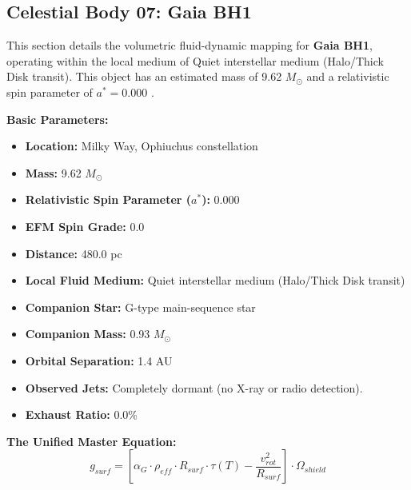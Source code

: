 \documentclass[11pt, a4paper]{article}
\begin{document}
\clearpage
\subsection{Celestial Body 07: Gaia BH1}
This section details the volumetric fluid-dynamic mapping for \textbf{Gaia BH1}, operating within the local medium of Quiet interstellar medium (Halo/Thick Disk transit). This object has an estimated mass of 9.62 $M_{\odot}$ and a relativistic spin parameter of $a^* = 0.000$ \cite{el-badry2023, simbad}.

\vspace{0.5em}
\noindent \textbf{Basic Parameters:}
\begin{itemize}
  \item \textbf{Location:} Milky Way, Ophiuchus constellation
  \item \textbf{Mass:} 9.62 $M_{\odot}$
  \item \textbf{Relativistic Spin Parameter ($a^*$):} 0.000
  \item \textbf{EFM Spin Grade:} 0.0
  \item \textbf{Distance:} 480.0 pc
  \item \textbf{Local Fluid Medium:} Quiet interstellar medium (Halo/Thick Disk transit)
  \item \textbf{Companion Star:} G-type main-sequence star
  \item \textbf{Companion Mass:} 0.93 $M_{\odot}$
  \item \textbf{Orbital Separation:} 1.4 AU
  \item \textbf{Observed Jets:} Completely dormant (no X-ray or radio detection).
  \item \textbf{Exhaust Ratio:} 0.0\%
\end{itemize}

\vspace{0.5em}
\noindent \textbf{The Unified Master Equation:}
$$ g_{surf} = \left[ \alpha_G \cdot \rho_{eff} \cdot R_{surf} \cdot \tau(T) - \frac{v_{rot}^2}{R_{surf}} \right] \cdot \Omega_{shield} $$
\end{document}
